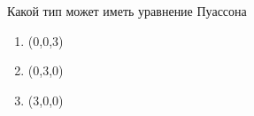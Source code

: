 Какой тип может иметь уравнение Пуассона

\begin{enumerate}[label=\arabic*)]
    \item (0,0,3)
    \item (0,3,0)
    \item (3,0,0)
\end{enumerate}

